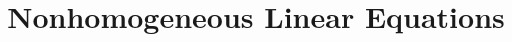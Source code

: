 \documentclass{ximera}
\title[Dig-In:]{Nonhomogeneous Linear Equations}
\begin{document}
\begin{abstract}
  
\end{abstract}
\maketitle
\end{document}

